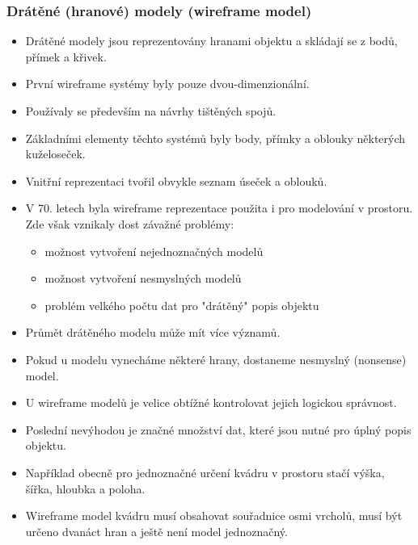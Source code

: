 \subsubsection{Drátěné (hranové) modely (wireframe model)}
\begin{itemize}
	\item Drátěné modely jsou reprezentovány hranami objektu a skládají se z bodů, přímek a křivek.
	\item První wireframe systémy byly pouze dvou-dimenzionální.
	\item Používaly se především na návrhy tištěných spojů.
	\item Základními elementy těchto systémů byly body, přímky a oblouky některých kuželoseček.
	\item Vnitřní reprezentaci tvořil obvykle seznam úseček a oblouků.
	\item V 70. letech byla wireframe reprezentace použita i pro modelování v prostoru. Zde však vznikaly dost závažné problémy:
	\begin{itemize}
		\item možnost vytvoření nejednoznačných modelů
		\item možnost vytvoření nesmyslných modelů
		\item problém velkého počtu dat pro "drátěný" popis objektu
	\end{itemize}
	\item Průmět drátěného modelu může mít více významů.
	\item Pokud u modelu vynecháme některé hrany, dostaneme nesmyslný (nonsense) model.
	\item U wireframe modelů je velice obtížné kontrolovat jejich logickou správnost.
	\item Poslední nevýhodou je značné množství dat, které jsou nutné pro úplný popis objektu. 
	\item Například obecně pro jednoznačné určení kvádru v prostoru stačí výška, šířka, hloubka a poloha.
	\item Wireframe model kvádru musí obsahovat souřadnice osmi vrcholů, musí být určeno dvanáct hran a ještě není model jednoznačný.
\end{itemize}


